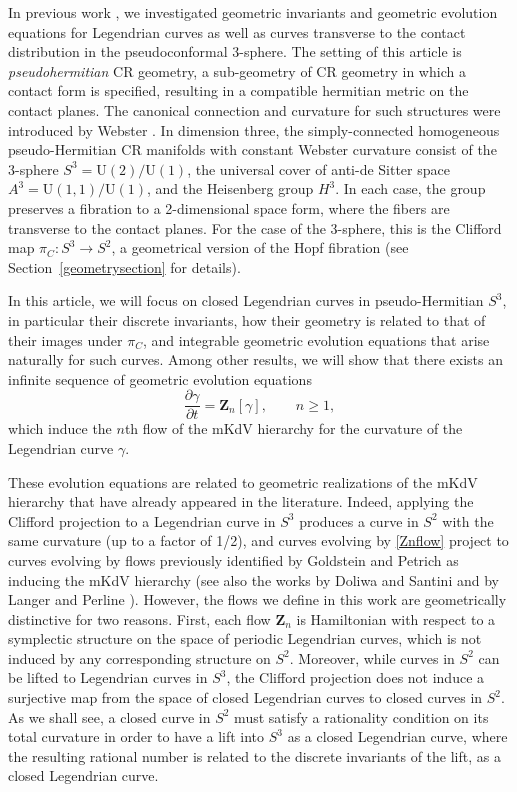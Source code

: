 \documentclass[10pt,a4paper]{amsart}
\newcommand\VZ{\mathbf Z}
\def\gam{\gamma} %
\def\di{\partial}
\newcommand\rU{\mathrm U}
\numberwithin{equation}{section}
\begin{document}
In previous work \cite{CI21,M,MNS, MS}, we investigated
geometric invariants and geometric evolution equations for Legendrian curves as well as curves transverse to the contact distribution in the pseudoconformal 3-sphere.
The setting of this article is {\em pseudohermitian} CR geometry, a sub-geometry of CR geometry in which a contact form is specified, resulting in a compatible
hermitian metric on the contact planes. The canonical connection and curvature for such structures were introduced by Webster \cite{W}. In dimension three, the simply-connected homogeneous pseudo-Hermitian CR manifolds with constant Webster curvature consist of the 3-sphere
$S^3 = \rU(2)/\rU(1)$, the universal cover of anti-de Sitter space $A^3 = \rU(1,1)/\rU(1)$, and the Heisenberg group $H^3$. In each case, the group preserves a fibration to a 2-dimensional space form, where the fibers are transverse to the contact planes.
For the case of the 3-sphere, this is the Clifford map
$\pi_C\colon   S^3 \to S^2$,
a geometrical version of the Hopf fibration (see Section~\ref{geometrysection} for details).

In this article, we will focus on closed Legendrian curves in pseudo-Hermitian $S^3$, in particular their discrete invariants, how their geometry is related
to that of their images
under $\pi_C$, and integrable geometric evolution equations that arise naturally for such curves.
Among other results, we will show that there exists an infinite sequence of geometric evolution equations
\begin{equation}\label{Znflow}
\dfrac{\di \gam}{\di t} = \VZ_n[\gam],\qquad n\ge 1,
\end{equation}
which induce the $n$th flow of the mKdV hierarchy for the curvature of the Legendrian curve $\gam$.

These evolution equations are related to geometric realizations of the mKdV hierarchy that
have already appeared in the literature.
Indeed, applying the Clifford projection to a Legendrian curve in $S^3$ produces
a curve in $S^2$ with the same curvature (up to a factor of 1/2), and curves evolving
by \eqref{Znflow} project to curves evolving by flows previously
identified by Goldstein and Petrich \cite{GP1,GP2} as inducing the mKdV hierarchy (see also the works by Doliwa and Santini \cite{DS} and by Langer and Perline \cite{LP}).
However, the flows we define in this work are geometrically distinctive for two reasons.
First, each flow $\VZ_n$ is Hamiltonian with respect to a symplectic structure on the space of periodic Legendrian curves, which is not induced by any corresponding
structure on $S^2$. Moreover, while curves in $S^2$ can be lifted to Legendrian curves in $S^3$, the Clifford projection does not induce a surjective map from
the space of closed Legendrian curves to closed curves in $S^2$. As we shall see,
a closed curve in $S^2$ must satisfy a rationality condition on its total curvature in order to have a lift into $S^3$ as a closed Legendrian curve, where the resulting rational number is related to the discrete invariants of the lift, as a closed Legendrian curve.
\end{document}
